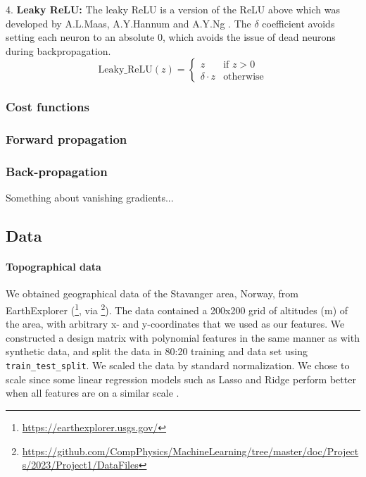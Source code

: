 4. \textbf{Leaky ReLU:}
The leaky ReLU is a version of the ReLU above which was developed by A.L.Maas, A.Y.Hannum and A.Y.Ng \cite{relu_best_ever}. The $\delta$ coefficient avoids
setting each neuron to an absolute 0, which avoids the issue of dead neurons during backpropagation.
\[
\text{Leaky\_ReLU}(z) = 
\begin{cases} 
   z & \text{if } z > 0 \\
   \delta \cdot z & \text{otherwise}
\end{cases}
\]


\subsubsection{Cost functions}\label{sssec:cost_functions}


\subsubsection{Forward propagation}\label{sssec:forward_propagation}


\subsubsection{Back-propagation}\label{sssec:backpropagation}

Something about vanishing gradients...


\subsection{Data}\label{ssec:data}
%
\paragraph{Topographical data}
We obtained geographical data of the Stavanger area, Norway, from EarthExplorer (\footnote{\url{https://earthexplorer.usgs.gov/}}, 
via \footnote{\url{https://github.com/CompPhysics/MachineLearning/tree/master/doc/Projects/2023/Project1/DataFiles}}). 
The data contained a 200x200 grid of altitudes (m) of the area, with arbitrary x- and y-coordinates that we used as our features. 
We constructed a design matrix with polynomial features in the same manner as with synthetic data, and split the data in 80:20 training 
and data set using \texttt{train\_test\_split}. We scaled the data by standard normalization. We chose to scale since some linear regression 
models such as Lasso and Ridge perform better when all features are on a similar scale \supercite{raschka2019}. 

